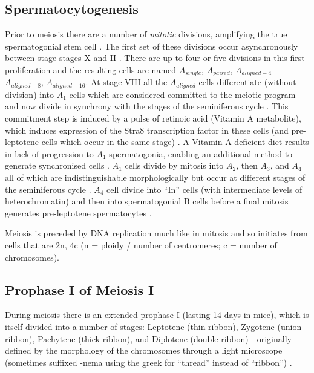 \subsection{Spermatocytogenesis}
Prior to meiosis there are a number of \emph{mitotic} divisions, amplifying the true spermatogonial stem cell \parencite{Oakberg1971Spermatogonial, Huckins1971spermatogonial}. The first set of these divisions occur asynchronously between stage stages X and II \parencite{Rooij2001Proliferation}. There are up to four or five divisions in this first proliferation and the resulting cells are named $A_{single}$, $A_{paired}$, $A_{aligned-4}$ $A_{aligned-8}$, $A_{aligned-16}$. At stage VIII all the $A_{aligned}$ cells differentiate (without division) into $A_1$ cells which are considered committed to the meiotic program and now divide in synchrony with the stages of the seminiferous cycle \parencite{Rooij2000All}. This commitment step is induced by a pulse of retinoic acid (Vitamin A metabolite), which induces expression of the Stra8 transcription factor in these cells (and pre-leptotene cells which occur in the same stage) \parencite{Griswold2012Initiating, Lin2008Germ, Zhou2008Expression, Hogarth2015Processive, Griswold2015Spermatogenesis}. A Vitamin A deficient diet results in lack of progression to $A_1$ spermatogonia, enabling an additional method to generate synchronised cells \parencite{Thompson1964Vitamin}. $A_1$ cells divide by mitosis into $A_2$, then $A_3$, and $A_4$ all of which are indistinguishable morphologically but occur at different stages of the seminiferous cycle \parencite{Rooij2000All}. $A_4$ cell divide into ``In'' cells (with intermediate levels of heterochromatin) and then into spermatogonial B cells before a final mitosis generates pre-leptotene spermatocytes \parencite{Rooij2000All}.

Meiosis is preceded by DNA replication much like in mitosis and so initiates from cells that are 2n, 4c (n = ploidy / number of centromeres; c = number of chromosomes).

\subsection{Prophase I of Meiosis I}
During meiosis there is an extended prophase I (lasting 14 days in mice), which is itself divided into a number of stages: Leptotene (thin ribbon), Zygotene (union ribbon), Pachytene (thick ribbon), and Diplotene (double ribbon) - originally defined by the morphology of the chromosomes through a light microscope (sometimes suffixed -nema using the greek for ``thread'' instead of ``ribbon'') \parencite{DeWiniwarter1900Recherches, Gregoire1907formation, Wilson1912Studies, Zickler1998leptotenezygotene}.


